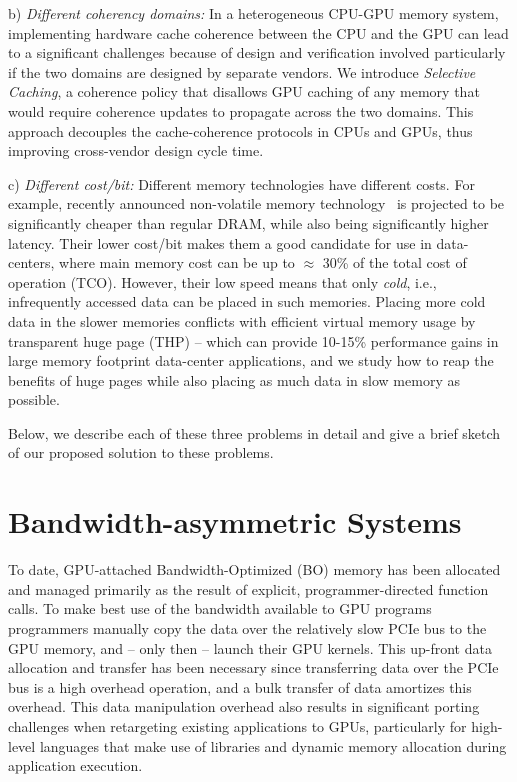 b) {\it Different coherency domains:} 
In a heterogeneous CPU-GPU memory system, implementing hardware cache coherence
between the CPU and the GPU can lead to a significant challenges because of
design and verification involved particularly if the two domains are designed by
separate vendors. We introduce {\it Selective Caching}, a coherence policy
that disallows GPU caching of any memory that would require coherence updates to
propagate across the two domains. This approach decouples the cache-coherence
protocols in CPUs and GPUs, thus improving cross-vendor design cycle time.

c) {\it Different cost/bit:} Different memory technologies have different costs.
For example, recently announced non-volatile memory technology~\cite{xpoint} is
projected to be significantly cheaper than regular DRAM, while also being
significantly higher latency. Their lower cost/bit makes them a good candidate
for use in data-centers, where main memory cost can be up to $\approx$ 30\% of
the total cost of operation (TCO). However, their low speed means that only {\it
cold}, i.e., infrequently accessed data can be placed in such memories.  Placing
more cold data in the slower memories conflicts with efficient virtual memory
usage by transparent huge page (THP) -- which can provide 10-15\% performance
gains in large memory footprint data-center applications, and we study how to
reap the benefits of huge pages while also placing as much data in slow memory
as possible.

Below, we describe each of these three problems in detail and give a brief
sketch of our proposed solution to these problems.

\section{Bandwidth-asymmetric Systems}
To date, GPU-attached Bandwidth-Optimized (BO) memory has been allocated and
managed primarily as the result of explicit, programmer-directed function calls.
To make best use of the bandwidth available to GPU programs programmers manually
copy the data over the relatively slow PCIe bus to the GPU memory, and -- only
then -- launch their GPU kernels.  This up-front data allocation and transfer
has been necessary since transferring data over the PCIe bus is a high overhead
operation, and a bulk transfer of data amortizes this overhead. This data
manipulation overhead also results in significant porting challenges when
retargeting existing applications to GPUs, particularly for high-level languages
that make use of libraries and dynamic memory allocation during application
execution.

